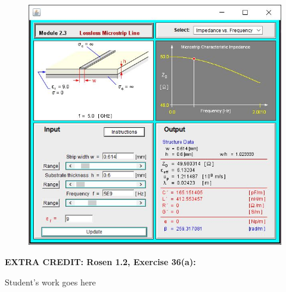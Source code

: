 \documentclass{article}
\begin{document}
\begin{figure}[h!]
    \centering
    \includegraphics{problem-2-11.JPG}    
\end{figure}

\newpage


\noindent
{\bf EXTRA CREDIT:  Rosen 1.2, Exercise 36(a):}  \\



\vspace*{1cm}
\noindent
Student's work goes here\\
\end{document}
